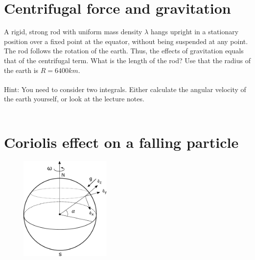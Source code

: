 \documentclass{article}
\begin{document}
    \newpage
    \section{Centrifugal force and gravitation}

    \begin{figure}        
    \end{figure}

    A rigid, strong rod with uniform mass density $\lambda$ hangs upright in a stationary position over a fixed point at the equator, without being suspended at any point. The rod follows the rotation of the earth. Thus, the effects of gravitation equals that of the centrifugal term. What is the length of the rod? Use that the radius of the earth is $R = 6400 \si{km}$.
    \\
    \\
    Hint: You need to consider two integrals. Either calculate the angular velocity of the earth yourself, or look at the lecture notes.
    \\
    \\

    \section{Coriolis effect on a falling particle}

    \begin{figure}
        \includegraphics[width=0.4\textwidth]{figures/exercise_6_4_earth.pdf}        
    \end{figure}
\end{document}

